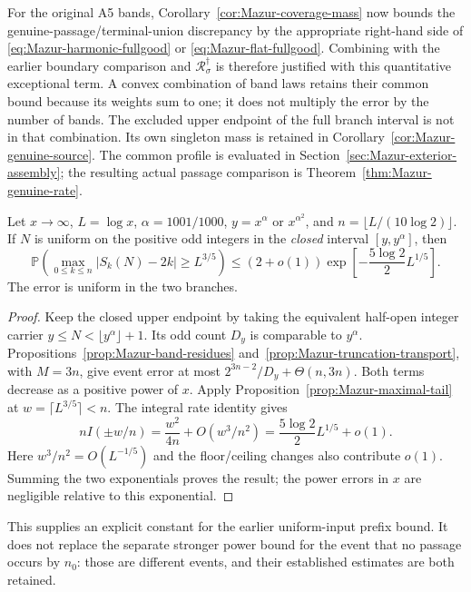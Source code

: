 For the original A5 bands, Corollary~\ref{cor:Mazur-coverage-mass}
now bounds the genuine-passage/terminal-union discrepancy by the
appropriate right-hand side of
\eqref{eq:Mazur-harmonic-fullgood} or
\eqref{eq:Mazur-flat-fullgood}. Combining with the earlier boundary
comparison and $\mathcal R_\sigma^\dagger$ is therefore justified
with this quantitative exceptional term. A convex combination of
band laws retains their common bound because its weights sum to one;
it does not multiply the error by the number of bands.
The excluded upper endpoint of the full branch interval is not in
that combination. Its own singleton mass is retained in
Corollary~\ref{cor:Mazur-genuine-source}. The common profile is evaluated
in Section~\ref{sec:Mazur-exterior-assembly}; the resulting actual passage
comparison is Theorem~\ref{thm:Mazur-genuine-rate}.

\begin{corollary}
\label{cor:Mazur-allikvere-prefix}
Let $x\to\infty$, $L=\log x$, $\alpha=1001/1000$,
$y=x^\alpha$ or $x^{\alpha^2}$, and
$n=\lfloor L/(10\log2)\rfloor$.
If $N$ is uniform on the positive odd integers in the
\emph{closed} interval $[y,y^\alpha]$, then
\begin{equation}
 \mathbb P\left(\max_{0\le k\le n}|S_k(N)-2k|\ge L^{3/5}\right)
 \le(2+o(1))\exp\left[-\frac{5\log2}{2}L^{1/5}\right].
 \label{eq:Mazur-allikvere-prefix}
\end{equation}
The error is uniform in the two branches.
\end{corollary}
\begin{proof}
Keep the closed upper endpoint by taking the equivalent half-open
integer carrier $y\le N<\lfloor y^\alpha\rfloor+1$.
Its odd count $D_y$ is comparable to $y^\alpha$.
Propositions~\ref{prop:Mazur-band-residues}
and~\ref{prop:Mazur-truncation-transport}, with $M=3n$, give event
error at most $2^{3n-2}/D_y+\Theta(n,3n)$.
Both terms decrease as a positive power of $x$.
Apply Proposition~\ref{prop:Mazur-maximal-tail} at
$w=\lceil L^{3/5}\rceil<n$. The integral rate identity gives
\[
 nI(\pm w/n)=\frac{w^2}{4n}+O(w^3/n^2)
            =\frac{5\log2}{2}L^{1/5}+o(1).
\]
Here $w^3/n^2=O(L^{-1/5})$ and the floor/ceiling changes also
contribute $o(1)$. Summing the two exponentials proves the result;
the power errors in $x$ are negligible relative to this exponential.
\end{proof}

This supplies an explicit constant for the earlier uniform-input
prefix bound. It does not replace the separate stronger power bound
for the event that no passage occurs by $n_0$: those are different
events, and their established estimates are both retained.

